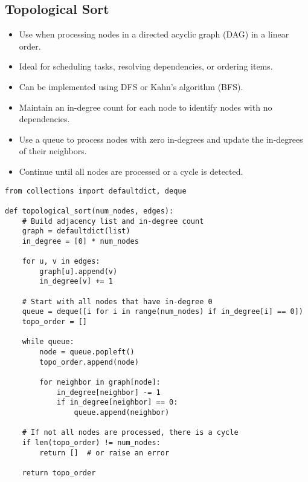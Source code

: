 \subsection{Topological Sort}
\begin{summary}
    \begin{itemize}
        \item Use when processing nodes in a directed acyclic graph (DAG) in a linear order.
        \item Ideal for scheduling tasks, resolving dependencies, or ordering items.
        \item Can be implemented using DFS or Kahn's algorithm (BFS).
        \item Maintain an in-degree count for each node to identify nodes with no dependencies.
        \item Use a queue to process nodes with zero in-degrees and update the in-degrees of their neighbors.
        \item Continue until all nodes are processed or a cycle is detected.
    \end{itemize}
\end{summary}

\begin{algo}
\begin{lstlisting}
from collections import defaultdict, deque

def topological_sort(num_nodes, edges):
    # Build adjacency list and in-degree count
    graph = defaultdict(list)
    in_degree = [0] * num_nodes

    for u, v in edges:
        graph[u].append(v)
        in_degree[v] += 1

    # Start with all nodes that have in-degree 0
    queue = deque([i for i in range(num_nodes) if in_degree[i] == 0])
    topo_order = []

    while queue:
        node = queue.popleft()
        topo_order.append(node)

        for neighbor in graph[node]:
            in_degree[neighbor] -= 1
            if in_degree[neighbor] == 0:
                queue.append(neighbor)

    # If not all nodes are processed, there is a cycle
    if len(topo_order) != num_nodes:
        return []  # or raise an error

    return topo_order
\end{lstlisting}
        
\end{algo}